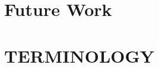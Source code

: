 \documentclass[conference]{IEEEtran}
\newcommand\bashstyle{
	\lstset{
		language=Bash,
		basicstyle=\ttm,
		showstringspaces=false,
		tabsize=2,
		aboveskip=0.2cm,
		belowskip=0.2cm,
		prebreak=\textbackslash,
		extendedchars=true,
		mathescape=false,
		linewidth=8.85cm,
		breaklines=true
	}
}
\newcommand\bashexternal[2][]{{\bashstyle}}
\newcommand\cstyle{
	\lstset{
		language=c,
		basicstyle=\ttm,
		showstringspaces=false,
		tabsize=4,
		aboveskip=0.2cm,
		belowskip=0.2cm,
		otherkeywords={self},             %
		keywordstyle=\ttb\color{deepblue},
		emph={MyClass,__init__},          %
		emphstyle=\ttb\color{deepred},    %
		stringstyle=\color{deepgreen},
		frame=tb,                          %
		prebreak=\textbackslash,
		linewidth=8.85cm,
		breaklines=true,
	}
}
\newcommand\cexternal[2][]{{\cstyle}}
\begin{document}
\section{Future Work} \label{future}

%



\section*{TERMINOLOGY} \label{term}

\end{document}
